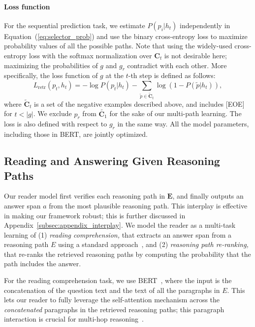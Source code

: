 \vspace{-2mm}\paragraph{Loss function}
For the sequential prediction task, we estimate $P(p_i|h_t)$ independently in Equation~(\ref{eq:selector_prob}) and use the binary cross-entropy loss to maximize probability values of all the possible paths.
Note that using the widely-used cross-entropy loss with the softmax normalization over $\mathbf{C}_t$ is not desirable here; maximizing the probabilities of $g$ and $g_r$ contradict with each other.
More specifically, the loss function of $g$ at the $t$-th step is defined as follows:
\begin{equation}
    L_\mathrm{retr}(p_t, h_t) = -\log{P(p_t|h_t)} - \sum_{\tilde{p}\in\tilde{\mathbf{C}}_t} \log{(1-P(\tilde{p}|h_t))},
\end{equation}
where $\tilde{\mathbf{C}}_t$ is a set of the negative examples described above, and includes [EOE] for $t < |g|$.
We exclude $p_r$ from $\tilde{\mathbf{C}_1}$ for the sake of our multi-path learning.
The loss is also defined with respect to $g_r$ in the same way.
All the model parameters, including those in BERT, are jointly optimized.

\subsection{Reading and Answering Given Reasoning Paths}
\label{sec:reader}
Our reader model first verifies each reasoning path in $\mathbf{E}$, and finally outputs an answer span $a$ from the most plausible reasoning path.
This interplay is effective in making our framework robust; this is further discussed in Appendix~\ref{subsec:appendix_interplay}.
We model the reader as a multi-task learning of (1) {\it reading comprehension,} that extracts an answer span from a reasoning path $E$ using a standard approach~\citep{seo2016bidirectional,xiong2017dynamic,devlin2018bert}, and (2) {\it reasoning path re-ranking,} that re-ranks the retrieved reasoning paths by computing the probability that the path includes the answer.

For the reading comprehension task, we use BERT~\citep{devlin2018bert}, where the input is the concatenation of the question text and the text of all the paragraphs in $E$.
This lets our reader to fully leverage the self-attention mechanism across the {\it concatenated} paragraphs in the retrieved reasoning paths; this paragraph interaction is crucial for multi-hop reasoning~\citep{wang-etal-2019-multi-hop}.

